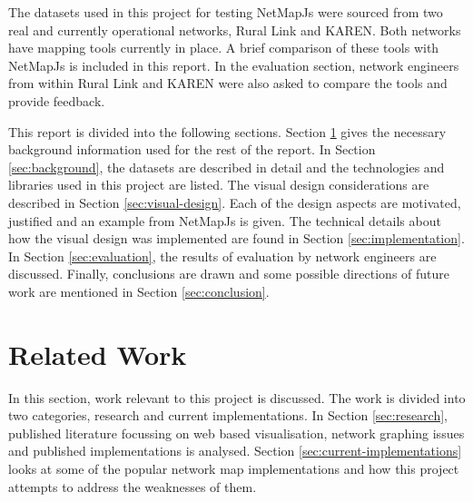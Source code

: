 \documentclass[11pt, a4paper]{article}
\begin{document}

The datasets used in this project for testing NetMapJs were sourced from two
real and currently operational networks, Rural Link and KAREN. Both networks
have mapping tools currently in place. A brief comparison of these tools with
NetMapJs is included in this report. In the evaluation section, network
engineers from within Rural Link and KAREN were also asked to compare the tools
and provide feedback. 

This report is divided into the following sections. Section
\ref{sec:related-work} gives the necessary background information used for the
rest of the report. In Section \ref{sec:background}, the datasets are described in
detail and the technologies and libraries used in this project are listed. The
visual design considerations are described in Section \ref{sec:visual-design}.
Each of the design aspects are motivated, justified and an example from NetMapJs
is given. The technical details about how the visual design was implemented are
found in Section \ref{sec:implementation}. In Section \ref{sec:evaluation}, the
results of evaluation by network engineers are discussed. Finally, conclusions
are drawn and some possible directions of future work are mentioned in Section
\ref{sec:conclusion}.

\newpage

\section{Related Work}
\label{sec:related-work}

In this section, work relevant to this project is discussed. The work is divided
into two categories, research and current implementations. In Section
\ref{sec:research}, published literature focussing on web based visualisation,
network graphing issues and published implementations is analysed. Section
\ref{sec:current-implementations} looks at some of the popular network map
implementations and how this project attempts to address the weaknesses of them.
\end{document}
